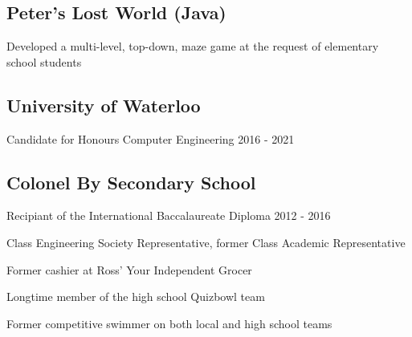 \documentclass[10pt, letterpaper]{myCV}
\begin{document}
\subsection{Peter's Lost World (Java)}
\begin{desc}
    \item Developed a multi-level, top-down, maze game at the request of elementary school students
\end{desc}

\subsection{University of Waterloo}
Candidate for Honours Computer Engineering \hfill 2016 - 2021
\subsection{Colonel By Secondary School}
Recipiant of the International Baccalaureate Diploma \hfill 2012 - 2016

\begin{desc}
    \item Class Engineering Society Representative, former Class Academic Representative
    \item Former cashier at Ross' Your Independent Grocer
    \item Longtime member of the high school Quizbowl team
    \item Former competitive swimmer on both local and high school teams
\end{desc}
\end{document}
